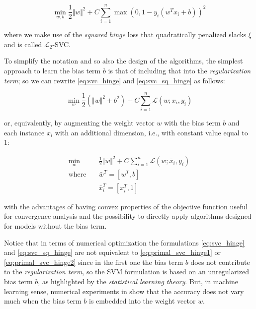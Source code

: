 \begin{equation} \label{eq:svc_sq_hinge}
    \min_{w,b} \frac{1}{2} \Vert w \Vert^2 + C \sum_{i=1}^n \max(0, 1 - y_i (w^T x_i + b))^2
\end{equation}

where we make use of the \emph{squared hinge} loss that quadratically penalized slacks $\xi$ and is called $\mathcal{L}_2$-SVC.

\bigskip
\bigskip

To simplify the notation and so also the design of the algorithms, the simplest approach to learn the bias term $b$ is that of including that into the \emph{regularization term}; so we can rewrite \ref{eq:svc_hinge} and \ref{eq:svc_sq_hinge} as follows:

\begin{equation} \label{eq:primal_svc_hinge1}
    \min_{w} \frac{1}{2} (\Vert w \Vert^2 + b^2) + C \sum_{i=1}^n \mathcal{L}(w;x_i,y_i)
\end{equation}

or, equivalently, by augmenting the weight vector $w$ with the bias term $b$ and each instance $x_i$ with an additional dimension, i.e., with constant value equal to 1:

\begin{equation} \label{eq:primal_svc_hinge2}
    \begin{aligned}
        \min_{w} \quad & \frac{1}{2} \Vert \bar{w} \Vert^2 + C \sum_{i=1}^n \mathcal{L}(w;\bar{x}_i,y_i) \\
            \textrm{where} \quad & \bar{w}^T = [w^T, b] \\ & \bar{x}_i^T = [x_i^T, 1]
    \end{aligned}
\end{equation}

with the advantages of having convex properties of the objective function useful for convergence analysis and the possibility to directly apply algorithms designed for models without the bias term.

Notice that in terms of numerical optimization the formulations \ref{eq:svc_hinge} and \ref{eq:svc_sq_hinge} are not equivalent to \ref{eq:primal_svc_hinge1} or \ref{eq:primal_svc_hinge2} since in the first one the bias term $b$ does not contribute to the \emph{regularization term}, so the SVM formulation is based on an unregularized bias term $b$, as highlighted by the \emph{statistical learning theory}. But, in machine learning sense, numerical experiments in \cite{hsu2002simple} show that the accuracy does not vary much when the bias term $b$ is embedded into the weight vector $w$.

